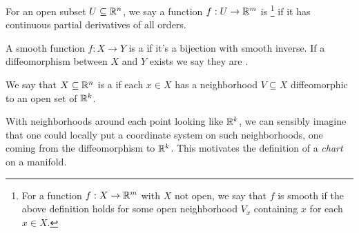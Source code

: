 \documentclass[a4paper, 10pt, twocolumn]{amsart}
\begin{document}
\begin{definition}[Smooth]
    For an open subset $U \subseteq \mathbb{R}^n$, we say a function $f: U \rightarrow \mathbb{R}^m$ is \footnote{For a function $f: X \rightarrow \mathbb{R}^m$ with $X$ not open, we say that $f$ is smooth if the above definition holds for some open neighborhood $V_x$ containing $x$ for each $x \in X$.} if it has continuous partial derivatives of all orders. 
\end{definition}

\begin{definition}[Diffeomorphism]
    A smooth function $f: X \rightarrow Y$ is a  if it's a bijection with smooth inverse. If a diffeomorphism between $X$ and $Y$ exists we say they are .
\end{definition}

\begin{definition}[Manifold]
    We say that $X \subseteq \mathbb{R}^n$ is a  if each $x \in X$ has a neighborhood $V \subseteq X$ diffeomorphic to an open set of $\mathbb{R}^k$. 
\end{definition}

With neighborhoods around each point looking like $\mathbb{R}^k$, we can sensibly imagine that one could locally put a coordinate system on such neighborhoods, one coming from the diffeomorphism to $\mathbb{R}^k$. This motivates the definition of a \emph{chart} on a manifold.
\end{document}
